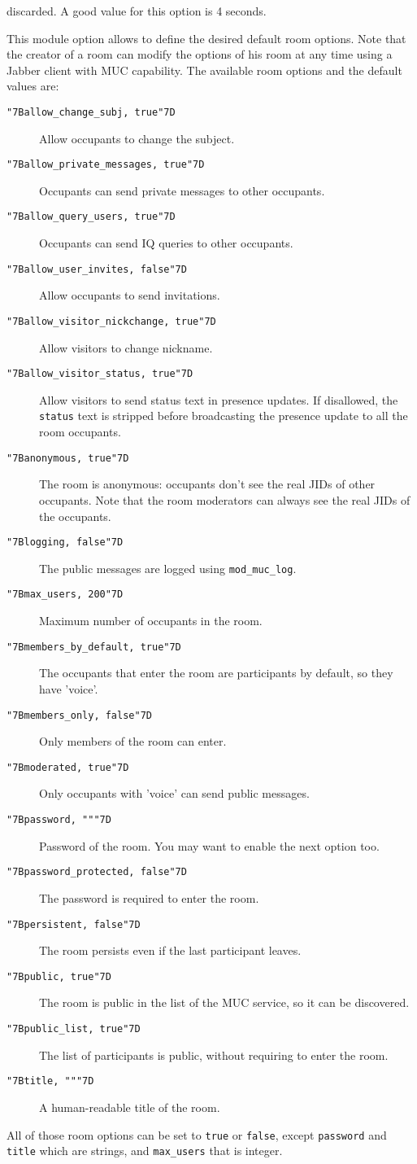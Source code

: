 \documentclass[a4paper,10pt]{book}
\newcommand{\ind}[1]{\begin{latexonly}\index{#1}\end{latexonly}}
\newcommand{\bracehack}{\def\{{\char"7B}\def\}{\char"7D}}
\newcommand{\titem}[1]{\item[\bracehack\texttt{#1}]}
\newcommand{\term}[1]{\texttt{#1}}
\begin{document}
\begin{description}
  discarded. A good value for this option is 4 seconds.
\titem{default\_room\_options} \ind{options!default\_room\_options}
  This module option allows to define the desired default room options.
  Note that the creator of a room can modify the options of his room
  at any time using a Jabber client with MUC capability.
  The available room options and the default values are:
  \begin{description}
  \titem{\{allow\_change\_subj, true\}} Allow occupants to change the subject.
  \titem{\{allow\_private\_messages, true\}} Occupants can send private messages to other occupants.
  \titem{\{allow\_query\_users, true\}} Occupants can send IQ queries to other occupants.
  \titem{\{allow\_user\_invites, false\}} Allow occupants to send invitations.
  \titem{\{allow\_visitor\_nickchange, true\}} Allow visitors to
  change nickname.
  \titem{\{allow\_visitor\_status, true\}} Allow visitors to send
  status text in presence updates.  If disallowed, the \term{status}
  text is stripped before broadcasting the presence update to all
  the room occupants.
  \titem{\{anonymous, true\}} The room is anonymous:
  occupants don't see the real JIDs of other occupants.
  Note that the room moderators can always see the real JIDs of the occupants.
  \titem{\{logging, false\}} The public messages are logged using \term{mod\_muc\_log}.
  \titem{\{max\_users, 200\}} Maximum number of occupants in the room.
  \titem{\{members\_by\_default, true\}} The occupants that enter the room are participants by default, so they have 'voice'.
  \titem{\{members\_only, false\}} Only members of the room can enter.
  \titem{\{moderated, true\}} Only occupants with 'voice' can send public messages.
  \titem{\{password, ""\}} Password of the room. You may want to enable the next option too.
  \titem{\{password\_protected, false\}} The password is required to enter the room.
  \titem{\{persistent, false\}} The room persists even if the last participant leaves.
  \titem{\{public, true\}} The room is public in the list of the MUC service, so it can be discovered.
  \titem{\{public\_list, true\}} The list of participants is public, without requiring to enter the room.
  \titem{\{title, ""\}} A human-readable title of the room.
  \end{description}
  All of those room options can be set to \term{true} or \term{false},
  except \term{password} and \term{title} which are strings,
  and \term{max\_users} that is integer.
\end{description}
\end{document}

